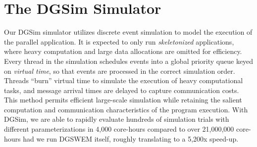 \section{The DGSim Simulator}
\label{sec:dgsim}
Our DGSim simulator utilizes discrete event simulation to model the
execution of the parallel application.
It is expected to only run {\em skeletonized} applications, where heavy
computation and large data allocations are omitted for efficiency.
Every thread in the simulation schedules events into a global priority queue
keyed on {\em virtual time}, so that events are processed in the
correct simulation order.
Threads ``burn'' virtual time to simulate the execution of heavy computational
tasks, and message arrival times are delayed to capture communication costs.
This method permits efficient large-scale
simulation while retaining the salient computation and communication
characteristics of the program execution.
With DGSim, we are able to rapidly evaluate hundreds of simulation trials with different
parameterizations in 4,000 core-hours compared to over 21,000,000 core-hours
had we run DGSWEM itself, roughly translating to a 5,200x speed-up.


